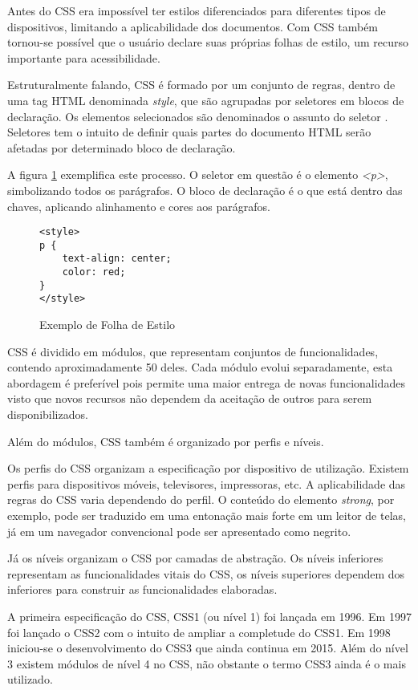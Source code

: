 Antes do CSS era impossível ter estilos diferenciados para diferentes
tipos de dispositivos, limitando a aplicabilidade dos documentos.
Com CSS também tornou-se possível que o usuário declare suas próprias
folhas de estilo, um recurso importante para acessibilidade.

Estruturalmente falando, CSS é formado por um conjunto de regras,
dentro de uma tag HTML denominada \textit{style}, que são agrupadas
por seletores em blocos de declaração. Os elementos selecionados são
denominados o assunto do seletor \autocite{cssSelectors}. Seletores tem
o intuito de definir quais partes do documento HTML serão afetadas por
determinado bloco de declaração.

A figura \ref{fig:CSSSample} exemplifica este processo. O seletor em
questão é o elemento \textit{<p>}, simbolizando todos os parágrafos. O bloco de
declaração é o que está dentro das chaves, aplicando alinhamento e
cores aos parágrafos.

\begin{figure}
\centering
\begin{verbatim}
<style>
p {
    text-align: center;
    color: red;
}
</style>
\end{verbatim}
\caption{Exemplo de Folha de Estilo}
\label{fig:CSSSample}
\end{figure}

CSS é dividido em módulos, que representam conjuntos de
funcionalidades, contendo aproximadamente 50 deles. Cada módulo evolui
separadamente, esta abordagem é preferível pois permite uma maior
entrega de novas funcionalidades visto que novos recursos não dependem
da aceitação de outros para serem disponibilizados.

Além do módulos, CSS também é organizado por perfis e níveis.

Os perfis do CSS organizam a especificação por dispositivo de
utilização. Existem perfis para dispositivos móveis, televisores,
impressoras, etc. A aplicabilidade das regras do CSS varia dependendo do
perfil. O conteúdo do elemento \textit{strong}, por exemplo, pode ser
traduzido em uma entonação mais forte em um leitor de telas, já em um
navegador convencional pode ser apresentado como negrito.

Já os níveis organizam o CSS por camadas de abstração. Os níveis
inferiores representam as funcionalidades vitais do CSS, os níveis
superiores dependem dos inferiores para construir as funcionalidades
elaboradas. %

A primeira especificação do CSS, CSS1 (ou nível 1) foi lançada em
1996. Em 1997 foi lançado o CSS2 com o intuito de ampliar a completude
do CSS1. Em 1998 iniciou-se o desenvolvimento do CSS3 que ainda continua
em 2015. Além do nível 3 existem módulos de nível 4 no CSS, não
obstante o termo CSS3 ainda é o mais utilizado.

